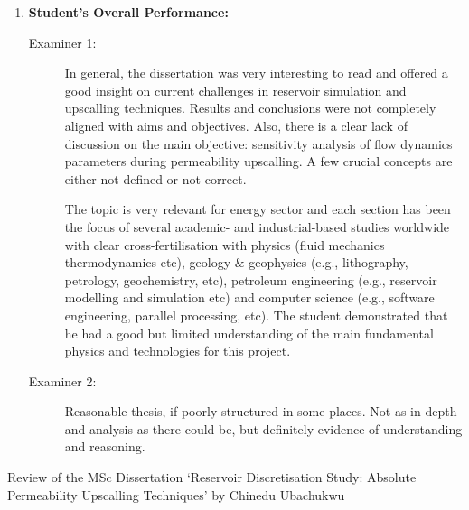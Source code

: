 \documentclass[14pt,twoside]{report}
\begin{document}
\begin{enumerate}
%
    \item {\bf Student's Overall Performance:}
        \begin{description}
            \item[Examiner 1:] In general, the dissertation was very interesting to read and offered a good insight on current challenges in reservoir simulation and upscalling techniques. Results and conclusions were not completely aligned with aims and objectives. Also, there is a clear lack of discussion on the main objective: sensitivity analysis of flow dynamics parameters during permeability upscalling. A few crucial concepts are either not defined or not correct.

The topic is very relevant for energy sector and each section has been the focus of several academic- and industrial-based studies worldwide with clear cross-fertilisation with physics (fluid mechanics thermodynamics etc), geology $\&$ geophysics (e.g., lithography, petrology, geochemistry, etc), petroleum engineering (e.g., reservoir modelling and simulation etc) and computer science (e.g., software engineering, parallel processing, etc). The student demonstrated that he had a good but limited understanding of the main fundamental physics and technologies for this project.

            \item[Examiner 2:] Reasonable thesis, if poorly structured in some places. Not as in-depth and analysis as there could be, but definitely evidence of understanding and reasoning.
        \end{description}
%
\end{enumerate}
\clearpage




\bigskip

\begin{center}
{\Large Review of the MSc Dissertation `Reservoir Discretisation Study: Absolute Permeability Upscalling Techniques' by Chinedu Ubachukwu}
\end{center}
\end{document}
